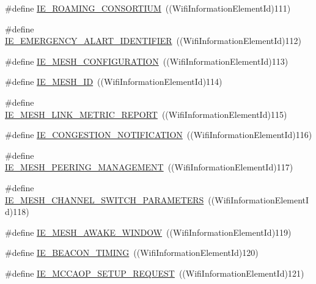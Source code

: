 \begin{DoxyCompactItemize}
\item 
\#define \hyperlink{wifi-information-element_8h_a7d15d9dd7373c5c0199aad96771c6e79}{I\+E\+\_\+\+R\+O\+A\+M\+I\+N\+G\+\_\+\+C\+O\+N\+S\+O\+R\+T\+I\+UM}~((Wifi\+Information\+Element\+Id)111)
\item 
\#define \hyperlink{wifi-information-element_8h_a8474ad3763ef223fdfaa2b2b28aa74c4}{I\+E\+\_\+\+E\+M\+E\+R\+G\+E\+N\+C\+Y\+\_\+\+A\+L\+A\+R\+T\+\_\+\+I\+D\+E\+N\+T\+I\+F\+I\+ER}~((Wifi\+Information\+Element\+Id)112)
\item 
\#define \hyperlink{wifi-information-element_8h_a5a0f69527c958beca1ed4b009614d4a0}{I\+E\+\_\+\+M\+E\+S\+H\+\_\+\+C\+O\+N\+F\+I\+G\+U\+R\+A\+T\+I\+ON}~((Wifi\+Information\+Element\+Id)113)
\item 
\#define \hyperlink{wifi-information-element_8h_ae2847c76aa4afaa18011e77c32a7a752}{I\+E\+\_\+\+M\+E\+S\+H\+\_\+\+ID}~((Wifi\+Information\+Element\+Id)114)
\item 
\#define \hyperlink{wifi-information-element_8h_aaa1304d4c4da85d47a2b0f4461eabbfc}{I\+E\+\_\+\+M\+E\+S\+H\+\_\+\+L\+I\+N\+K\+\_\+\+M\+E\+T\+R\+I\+C\+\_\+\+R\+E\+P\+O\+RT}~((Wifi\+Information\+Element\+Id)115)
\item 
\#define \hyperlink{wifi-information-element_8h_a9ec39973ea932f352bb06c67d49843db}{I\+E\+\_\+\+C\+O\+N\+G\+E\+S\+T\+I\+O\+N\+\_\+\+N\+O\+T\+I\+F\+I\+C\+A\+T\+I\+ON}~((Wifi\+Information\+Element\+Id)116)
\item 
\#define \hyperlink{wifi-information-element_8h_ac165cb06d15fc79753f1bdcc8ac6b734}{I\+E\+\_\+\+M\+E\+S\+H\+\_\+\+P\+E\+E\+R\+I\+N\+G\+\_\+\+M\+A\+N\+A\+G\+E\+M\+E\+NT}~((Wifi\+Information\+Element\+Id)117)
\item 
\#define \hyperlink{wifi-information-element_8h_aa81ae93e64507ea93f876ece3ecf9e19}{I\+E\+\_\+\+M\+E\+S\+H\+\_\+\+C\+H\+A\+N\+N\+E\+L\+\_\+\+S\+W\+I\+T\+C\+H\+\_\+\+P\+A\+R\+A\+M\+E\+T\+E\+RS}~((Wifi\+Information\+Element\+Id)118)
\item 
\#define \hyperlink{wifi-information-element_8h_a96879d86fc090b7da915873d3366719c}{I\+E\+\_\+\+M\+E\+S\+H\+\_\+\+A\+W\+A\+K\+E\+\_\+\+W\+I\+N\+D\+OW}~((Wifi\+Information\+Element\+Id)119)
\item 
\#define \hyperlink{wifi-information-element_8h_a69575a38a31ff7556fa0f2e74aaf6dc7}{I\+E\+\_\+\+B\+E\+A\+C\+O\+N\+\_\+\+T\+I\+M\+I\+NG}~((Wifi\+Information\+Element\+Id)120)
\item 
\#define \hyperlink{wifi-information-element_8h_a023d3963433a0ac54984acca7a8b5545}{I\+E\+\_\+\+M\+C\+C\+A\+O\+P\+\_\+\+S\+E\+T\+U\+P\+\_\+\+R\+E\+Q\+U\+E\+ST}~((Wifi\+Information\+Element\+Id)121)

\end{DoxyCompactItemize}
